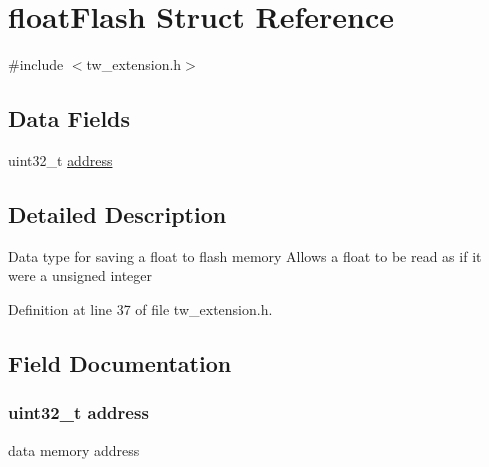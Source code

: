 \hypertarget{structfloat_flash}{\section{float\+Flash Struct Reference}
\label{structfloat_flash}
}


{\ttfamily \#include $<$tw\+\_\+extension.\+h$>$}

\subsection*{Data Fields}
\begin{DoxyCompactItemize}
\item 
\begin{tabbing}
xx\=xx\=xx\=xx\=xx\=xx\=xx\=xx\=xx\=\kill
union \{\\
\hypertarget{unionfloat_flash_1_1@0_a7d1d84fdc3ebeece5efd66344cc7cd00}{\>float {\bfseries fn} \mbox{[}1\mbox{]}\\
\hypertarget{unionfloat_flash_1_1@0_ab862c6a1532031c260de0cd8d480dc83}{\>uint32\_t {\bfseries uintn} \mbox{[}1\mbox{]}\\
\} \hyperlink{structfloat_flash_a26e87220519c775d0f9d4ac76db58ef2}{data}\\

\end{tabbing}\item 
uint32\+\_\+t \hyperlink{structfloat_flash_ac0d31ca829f934cccd89f8054e02773e}{address}
\end{DoxyCompactItemize}


\subsection{Detailed Description}
Data type for saving a float to flash memory Allows a float to be read as if it were a unsigned integer 

Definition at line 37 of file tw\+\_\+extension.\+h.



\subsection{Field Documentation}
\hypertarget{structfloat_flash_ac0d31ca829f934cccd89f8054e02773e}{
\subsubsection[{address}]{\setlength{\rightskip}{0pt plus 5cm}uint32\+\_\+t address}}\label{structfloat_flash_ac0d31ca829f934cccd89f8054e02773e}
data memory address 

